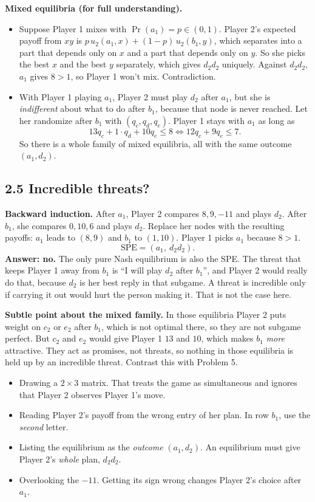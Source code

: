 \documentclass[11pt]{article}
\begin{document}
\textbf{Mixed equilibria (for full understanding).}
\begin{itemize}
\item Suppose Player 1 mixes with $\Pr(a_1)=p\in(0,1)$. Player 2's expected payoff from $xy$ is $p\,u_2(a_1,x)+(1-p)\,u_2(b_1,y)$, which separates into a part that depends only on $x$ and a part that depends only on $y$. So she picks the best $x$ and the best $y$ separately, which gives $d_2d_2$ uniquely. Against $d_2d_2$, $a_1$ gives $8>1$, so Player 1 won't mix. Contradiction.
\item With Player 1 playing $a_1$, Player 2 must play $d_2$ after $a_1$, but she is \emph{indifferent} about what to do after $b_1$, because that node is never reached. Let her randomize after $b_1$ with $(q_c,q_d,q_e)$. Player 1 stays with $a_1$ as long as
\[
13q_c+1\cdot q_d+10q_e\le 8 \iff 12q_c+9q_e\le 7 .
\]
So there is a whole family of mixed equilibria, all with the same outcome $(a_1,d_2)$.
\end{itemize}

\subsection*{2.5 Incredible threats?}
\textbf{Backward induction.} After $a_1$, Player 2 compares $8,9,-11$ and plays $d_2$. After $b_1$, she compares $0,10,6$ and plays $d_2$. Replace her nodes with the resulting payoffs: $a_1$ leads to $(8,9)$ and $b_1$ to $(1,10)$. Player 1 picks $a_1$ because $8>1$.
\[
\text{SPE}=(a_1,\ d_2d_2).
\]
\textbf{Answer: no.} The only pure Nash equilibrium is also the SPE. The threat that keeps Player 1 away from $b_1$ is ``I will play $d_2$ after $b_1$'', and Player 2 would really do that, because $d_2$ is her best reply in that subgame. A threat is incredible only if carrying it out would hurt the person making it. That is not the case here.

\textbf{Subtle point about the mixed family.} In those equilibria Player 2 puts weight on $c_2$ or $e_2$ after $b_1$, which is not optimal there, so they are not subgame perfect. But $c_2$ and $e_2$ would give Player 1 $13$ and $10$, which makes $b_1$ \emph{more} attractive. They act as promises, not threats, so nothing in those equilibria is held up by an incredible threat. Contrast this with Problem 5.

\begin{pitfall}
\begin{itemize}
\item Drawing a $2\times3$ matrix. That treats the game as simultaneous and ignores that Player 2 observes Player 1's move.
\item Reading Player 2's payoff from the wrong entry of her plan. In row $b_1$, use the \emph{second} letter.
\item Listing the equilibrium as the \emph{outcome} $(a_1,d_2)$. An equilibrium must give Player 2's \emph{whole} plan, $d_2d_2$.
\item Overlooking the $-11$. Getting its sign wrong changes Player 2's choice after $a_1$.
\end{itemize}
\end{pitfall}
\end{document}
